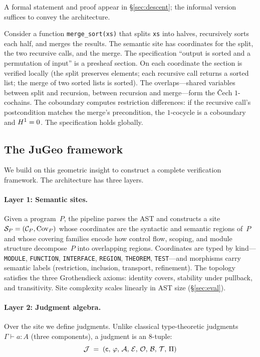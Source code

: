 A formal statement and proof appear in \S\ref{sec:descent}; the informal
version suffices to convey the architecture.

\begin{example}\label{ex:sort-intro}
Consider a \Python{} function \texttt{merge\_sort(xs)} that splits
\texttt{xs} into halves, recursively sorts each half, and merges the
results.  The semantic site has coordinates for the split, the two
recursive calls, and the merge.  The specification ``output is sorted
and a permutation of input'' is a presheaf section.  On each coordinate
the section is verified locally (the split preserves elements; each
recursive call returns a sorted list; the merge of two sorted lists is
sorted).  The overlaps---shared variables between split and recursion,
between recursion and merge---form the \v{C}ech $1$-cochains.  The
coboundary computes restriction differences: if the recursive call's
postcondition matches the merge's precondition, the $1$-cocycle is a
coboundary and $H^{1} = 0$.  The specification holds globally.
\end{example}

\subsection{The JuGeo framework}\label{sec:intro:framework}

We build on this geometric insight to construct a complete verification
framework.  The architecture has three layers.

\paragraph{Layer 1: Semantic sites.}
Given a \Python{} program~$P$, the \JuGeo{} pipeline parses the AST and
constructs a site $\mathcal{S}_P = (\mathcal{C}_P, \mathrm{Cov}_P)$ whose coordinates
are the syntactic and semantic regions of~$P$ and whose covering families
encode how control flow, scoping, and module structure decompose~$P$ into
overlapping regions.  Coordinates are typed by kind---\texttt{MODULE},
\texttt{FUNCTION}, \texttt{INTERFACE}, \texttt{REGION}, \texttt{THEOREM},
\texttt{TEST}---and morphisms carry semantic labels (restriction, inclusion,
transport, refinement).  The topology satisfies the three Grothendieck axioms:
identity covers, stability under pullback, and transitivity.  Site complexity
scales linearly in AST size (\S\ref{sec:eval}).

\paragraph{Layer 2: Judgment algebra.}
Over the site we define judgments.  Unlike classical type-theoretic
judgments $\Gamma \vdash a : A$ (three components), a \JuGeo{} judgment
is an 8-tuple:
\begin{equation}\label{eq:judgment}
  \mathcal{J} \;=\; (\mathsf{c},\,\varphi,\,\mathcal{A},\,\mathcal{E},\,\mathcal{O},\,\mathcal{B},\,\mathcal{T},\,\Pi)
\end{equation}

